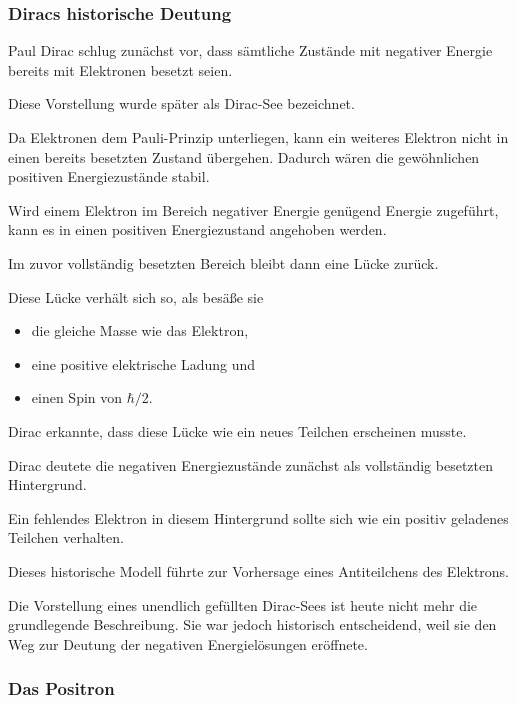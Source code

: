 \subsubsection*{Diracs historische Deutung}

Paul Dirac schlug zunächst vor,
dass sämtliche Zustände mit negativer Energie bereits mit Elektronen
besetzt seien.

Diese Vorstellung wurde später als Dirac-See%
 bezeichnet.

Da Elektronen dem Pauli-Prinzip%
 unterliegen, kann ein weiteres Elektron
nicht in einen bereits besetzten Zustand übergehen. Dadurch wären die
gewöhnlichen positiven Energiezustände stabil.

Wird einem Elektron im Bereich negativer Energie genügend Energie
zugeführt, kann es in einen positiven Energiezustand angehoben werden.

Im zuvor vollständig besetzten Bereich bleibt dann eine Lücke zurück.

Diese Lücke verhält sich so, als besäße sie

\begin{itemize}
	\item die gleiche Masse wie das Elektron,
	\item eine positive elektrische Ladung und
	\item einen Spin von \(\hbar/2\).
\end{itemize}

Dirac erkannte, dass diese Lücke wie ein neues Teilchen erscheinen
musste.

\begin{HistoryBox}
	\label{box:vorstellung_dirac_see}
	
	Dirac deutete die negativen Energiezustände zunächst als vollständig
	besetzten Hintergrund.
	
	Ein fehlendes Elektron in diesem Hintergrund sollte sich wie ein
	positiv geladenes Teilchen verhalten.
	
	Dieses historische Modell führte zur Vorhersage eines Antiteilchens
	des Elektrons.
\end{HistoryBox}

Die Vorstellung eines unendlich gefüllten Dirac-Sees ist heute nicht
mehr die grundlegende Beschreibung. Sie war jedoch historisch
entscheidend, weil sie den Weg zur Deutung der negativen
Energielösungen eröffnete.

\subsubsection*{Das Positron}

